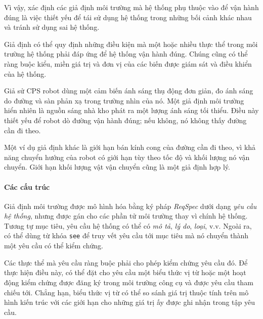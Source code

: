 Vì vậy, xác định các giả định môi trường mà hệ thống phụ thuộc vào để vận hành đúng là việc thiết yếu để tái sử dụng hệ thống trong những bối cảnh khác nhau và tránh sử dụng sai hệ thống.

Giả định có thể quy định những điều kiện mà một hoặc nhiều thực thể trong môi trường hệ thống phải đáp ứng để hệ thống vận hành đúng. Chúng cũng có thể ràng buộc kiểu, miền giá trị và đơn vị của các biến được giám sát và điều khiển của hệ thống.

Giả sử CPS robot dùng một cảm biến ánh sáng thụ động đơn giản, đo ánh sáng do đường và sàn phản xạ trong trường nhìn của nó. Một giả định môi trường hiển nhiên là nguồn sáng nhà kho phát ra một lượng ánh sáng tối thiểu. Điều này thiết yếu để robot dò đường vận hành đúng; nếu không, nó không thấy đường cần đi theo.

Một ví dụ giả định khác là giới hạn bán kính cong của đường cần đi theo, vì khả năng chuyển hướng của robot có giới hạn tùy theo tốc độ và khối lượng nó vận chuyển. Giới hạn khối lượng vật vận chuyển cũng là một giả định hợp lý.

\paragraph{Các cấu trúc}
Giả định môi trường được mô hình hóa bằng ký pháp \emph{ReqSpec} dưới dạng \emph{yêu cầu hệ thống}, nhưng được gán cho các phần tử môi trường thay vì chính hệ thống. Tương tự mục tiêu, yêu cầu hệ thống có thể có \emph{mô tả}, \emph{lý do}, \emph{loại}, v.v. Ngoài ra, có thể dùng từ khóa \texttt{see} để truy vết yêu cầu tới mục tiêu mà nó chuyển thành một yêu cầu có thể kiểm chứng.

Các thực thể mà yêu cầu ràng buộc phải cho phép kiểm chứng yêu cầu đó. Để thực hiện điều này, có thể đặt cho yêu cầu một biểu thức vị từ hoặc một hoạt động kiểm chứng được đăng ký trong môi trường công cụ và được yêu cầu tham chiếu tới. Chẳng hạn, biểu thức vị từ có thể so sánh giá trị thuộc tính trên mô hình kiến trúc với các giới hạn cho những giá trị ấy được ghi nhận trong tập yêu cầu.

